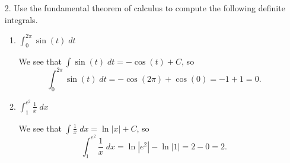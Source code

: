 \documentclass[11pt]{article}
\begin{document}
\newsavebox{\quizback}
\begin{lrbox}{\quizback}
\begin{minipage}[top][4.5in][t]{\textwidth} \setlength{\parindent}{1.5em}
\begin{enumerate}
\item[2.] Use the fundamental theorem of calculus to compute the following 
definite integrals.
  \begin{enumerate}
  \item $\displaystyle\int_0^{2\pi} \sin(t)\;dt$
    
    \vfill
    {\color{blue}

      We see that $\int \sin(t)\; dt = -\cos(t)+C$, so  
      \[
      \int_{0}^{2\pi} \sin(t)\;dt = -\cos(2\pi) + \cos(0) = -1 + 1 = 0.
      \]

    }
    \vfill

  \item $\displaystyle\int_1^{e^2} \frac{1}{x}\;dx$

    \vfill
    {\color{blue}

      We see that $\int \frac{1}{x}\; dx = \ln|x|+C$, so  
      \[
      \int_{1}^{e^2} \frac{1}{x}\;dx = \ln|e^2| - \ln|1| = 2 - 0 = 2.
      \]

    }
    \vfill

  \end{enumerate}
  
  


\end{enumerate}
\end{minipage}
\end{lrbox}

\noindent \usebox{\quizfront}
\vfill
\noindent \usebox{\quizback}

\end{document}
